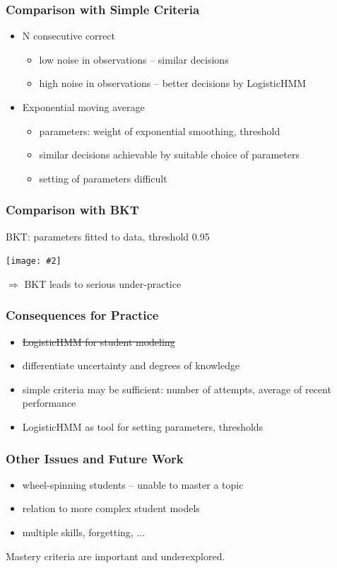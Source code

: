 \documentclass[bigger]{beamer}
\newcommand{\img}[2]{
  \begin{center}
    \texttt{[image: \#2]}
  \end{center}
}
\begin{document}
\begin{frame}
  \frametitle{Comparison with Simple Criteria}

  \begin{itemize}
  \item N consecutive correct
    \begin{itemize}
    \item low noise in observations -- similar decisions
    \item high noise in observations -- better decisions by LogisticHMM
    \end{itemize}
  \item Exponential moving average
    \begin{itemize}
    \item parameters: weight of exponential smoothing, threshold
    \item similar decisions achievable by suitable choice of parameters
    \item setting of parameters difficult
    \end{itemize}
  \end{itemize}
\end{frame}

\begin{frame}
  \frametitle{Comparison with BKT}

  BKT: parameters fitted to data, threshold 0.95

  \img{.7}{hmm_bkt}

  $\Rightarrow$ BKT leads to serious under-practice
\end{frame}

\begin{frame}
  \frametitle{Consequences for Practice}

  \begin{itemize}
  \item \sout{LogisticHMM for student modeling}
  \item differentiate uncertainty and degrees of knowledge
  \item simple criteria may be sufficient: number of attempts, average of
    recent performance
  \item LogisticHMM as tool for setting parameters, thresholds
  \end{itemize}
\end{frame}

\begin{frame}
  \frametitle{Other Issues and Future Work}

  \begin{itemize}
  \item wheel-spinning students -- unable to master a topic
  \item relation to more complex student models
  \item multiple skills, forgetting, ...
  \end{itemize}

  \bigskip

  \begin{block}{}
  \alert{Mastery criteria are important and underexplored.}
  \end{block}

\end{frame}
\end{document}
